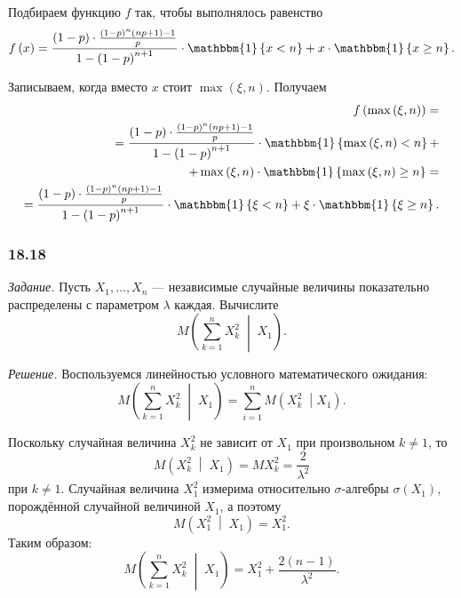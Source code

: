 \begin{enumerate}[label=\alph*)]
  Подбираем функцию $f$ так, чтобы выполнялось равенство
  $$f \left( x \right) =
    \frac{ \left( 1 - p \right) \cdot \frac{ \left( 1 - p \right)^n \left( np + 1 \right) - 1}{p}}{1 - \left( 1 - p \right)^{n + 1}} \cdot
    \mathbbm{1} \left\{ x < n \right\} +
    x \cdot \mathbbm{1} \left\{ x \geq n \right\}.$$

  Записываем, когда вместо $x$ стоит $ \max \left( \xi, n \right) $.
  Получаем
  \begin{equation*}
    \begin{split}
      f \left( \max \left( \xi, n \right) \right) = \\
      = \frac{ \left( 1 - p \right) \cdot \frac{ \left( 1 - p \right)^n \left( np + 1 \right) - 1}{p}}{1 - \left( 1 - p \right)^{n + 1}} \cdot
      \mathbbm{1} \left\{ \max \left( \xi, n \right) < n \right\} + \\
      + \max \left( \xi, n \right) \cdot
      \mathbbm{1} \left\{ \max \left( \xi, n \right) \geq n \right\} = \\
      = \frac{ \left( 1 - p \right) \cdot \frac{ \left( 1 - p \right)^n \left( np + 1 \right) - 1}{p}}{1 - \left( 1 - p \right)^{n + 1}} \cdot
      \mathbbm{1} \left\{ \xi < n \right\} +
      \xi \cdot \mathbbm{1} \left\{ \xi \geq n \right\}.
    \end{split}
  \end{equation*}
\end{enumerate}

\subsubsection*{18.18}

\textit{Задание.}
Пусть $X_1, \dotsc, X_n$ ---
независимые случайные величины показательно распределены с параметром $ \lambda $ каждая.
Вычислите
$$M \left( \sum \limits_{k = 1}^n X_k^2 \; \middle| \; X_1 \right).$$

\textit{Решение.} Воспользуемся линейностью условного математического ожидания:
$$M \left( \sum \limits_{k = 1}^n X_k^2 \; \middle| \; X_1 \right) =
  \sum \limits_{i = 1}^n M \left( X_k^2 \; \middle| X_1 \right).$$

Поскольку случайная величина $X_k^2$ не зависит от $X_1$ при произвольном $k \neq 1$, то
$$M \left( X_k^2 \; \middle| \; X_1 \right) =
  MX_k^2 =
  \frac{2}{ \lambda^2}$$
при $k \neq 1$.
Случайная величина $X_1^2$ измерима относительно $ \sigma $-алгебры $ \sigma \left( X_1 \right) $,
порождённой случайной величиной $X_1$,
а поэтому
$$M \left( X_1^2 \; \middle| \; X_1 \right) =
  X_1^2.$$
Таким образом:
$$M \left( \sum \limits_{k = 1}^n X_k^2 \; \middle| \; X_1 \right) =
  X_1^2 + \frac{2 \left( n - 1 \right) }{ \lambda^2}.$$
